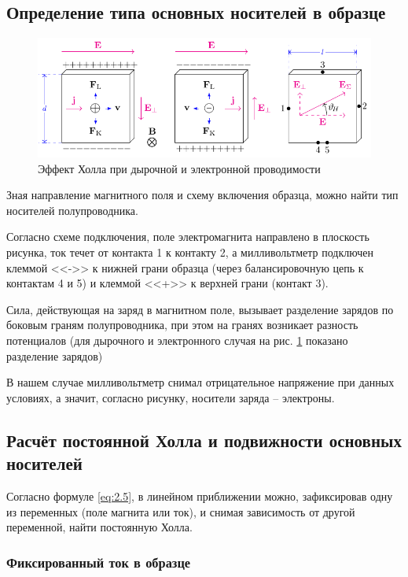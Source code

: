 \documentclass[a4paper,14pt]{extarticle}
\begin{document}
 




\subsection{Определение типа основных носителей в образце}

\begin{figure}[H]
	\centering
	\includegraphics[width=\linewidth]{fig/effect.pdf}
	\caption{Эффект Холла при дырочной и электронной проводимости \cite{lit0}}
	\label{fig:hall}
\end{figure}

Зная направление магнитного поля и схему включения образца, можно найти тип носителей полупроводника.

Согласно схеме подключения, поле электромагнита направлено в плоскость рисунка, ток течет от контакта 1 к контакту 2, а милливольтметр подключен клеммой <<->> к нижней грани образца (через балансировочную цепь к контактам 4 и 5) и клеммой <<+>> к верхней грани (контакт 3). 

Сила, действующая на заряд в магнитном поле, вызывает разделение зарядов по боковым граням полупроводника, при этом на гранях возникает разность потенциалов (для дырочного и электронного случая на рис. \ref{fig:hall} показано разделение зарядов)

В нашем случае милливольтметр снимал отрицательное напряжение при данных условиях, а значит, согласно рисунку, носители заряда -- электроны.

\subsection{Расчёт постоянной Холла и подвижности основных носителей}
Согласно формуле \eqref{eq:2.5}, в линейном приближении можно, зафиксировав одну из переменных (поле магнита или ток), и снимая зависимость от другой переменной, найти постоянную Холла.
\subsubsection{Фиксированный ток в образце}
\end{document}
